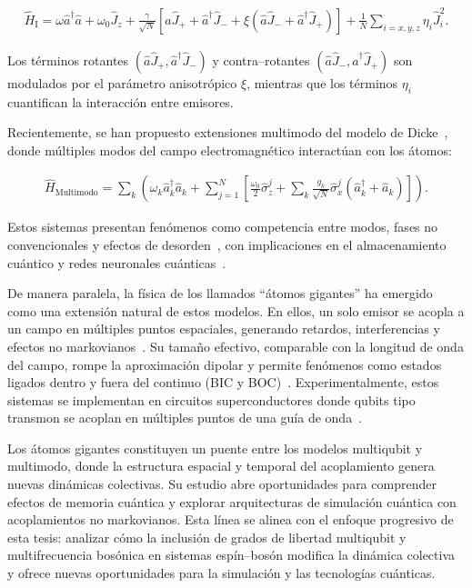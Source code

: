 \documentclass[onecolumn,notitlepage,letterpaper,aps,pra,12pt]{article}
\numberwithin{equation}{section}
\begin{document}
\begin{gather}\label{Hamiltoniano de Dicke con interacciones}
    \hat{H}_{\text{I}} = \omega\hat{a}^{\dagger}\hat{a} + \omega_{0}\hat{J}_{z} + \frac{\gamma}{\sqrt{N}}\left[ \hat{a}\hat{J}_{+} + \hat{a}^{\dagger}\hat{J}_{-} + \xi\left( \hat{a}\hat{J}_{-} + \hat{a}^{\dagger}\hat{J}_{+} \right)  \right] + \frac{1}{N}\sum_{i=x,y,z} \eta_{i}\hat{J}_{i}^{2}.
\end{gather}

Los términos rotantes $(\hat{a}\hat{J}_{+}, \hat{a}^{\dagger}\hat{J}_{-})$ y contra–rotantes $(\hat{a}\hat{J}_{-}, \hat{a}^{\dagger}\hat{J}_{+})$ son modulados por el parámetro anisotrópico $\xi$, mientras que los términos $\eta_{i}$ cuantifican la interacción entre emisores.

Recientemente, se han propuesto extensiones multimodo del modelo de Dicke~\cite{tolkunov2007,fiorelli2020,carollo2021}, donde múltiples modos del campo electromagnético interactúan con los átomos:

\begin{gather}
        \hat{H}_{\text{Multimodo}} = \sum_{k}\left(\omega_{k}\hat{a}^{\dagger}_{k}\hat{a}_{k} + \sum_{j=1}^{N}\left[ \frac{\omega_{0}}{2}\hat{\sigma}_{z}^{j} + \sum_{k}\frac{g_{k}}{\sqrt{N}}\hat{\sigma}_{x}^{j}\left(\hat{a}^{\dagger}_{k} + \hat{a}_{k}\right) \right]\right).
\end{gather}

Estos sistemas presentan fenómenos como competencia entre modos, fases no convencionales y efectos de desorden~\cite{rotondo2015,kipf2014,vojta2013,das2024}, con implicaciones en el almacenamiento cuántico y redes neuronales cuánticas~\cite{maniscalco2006,fiorelli2020,marsch2021}.

De manera paralela, la física de los llamados “átomos gigantes” ha emergido como una extensión natural de estos modelos. En ellos, un solo emisor se acopla a un campo en múltiples puntos espaciales, generando retardos, interferencias y efectos no markovianos~\cite{Andersson2019,gonzalez2021-2,cai2021,yu2025}. Su tamaño efectivo, comparable con la longitud de onda del campo, rompe la aproximación dipolar y permite fenómenos como estados ligados dentro y fuera del continuo (BIC y BOC)~\cite{gonzalez2025,guo2020}. Experimentalmente, estos sistemas se implementan en circuitos superconductores donde qubits tipo transmon se acoplan en múltiples puntos de una guía de onda~\cite{Kannan2020}.

Los átomos gigantes constituyen un puente entre los modelos multiqubit y multimodo, donde la estructura espacial y temporal del acoplamiento genera nuevas dinámicas colectivas. Su estudio abre oportunidades para comprender efectos de memoria cuántica y explorar arquitecturas de simulación cuántica con acoplamientos no markovianos. Esta línea se alinea con el enfoque progresivo de esta tesis: analizar cómo la inclusión de grados de libertad multiqubit y multifrecuencia bosónica en sistemas espín–bosón modifica la dinámica colectiva y ofrece nuevas oportunidades para la simulación y las tecnologías cuánticas.
\end{document}
